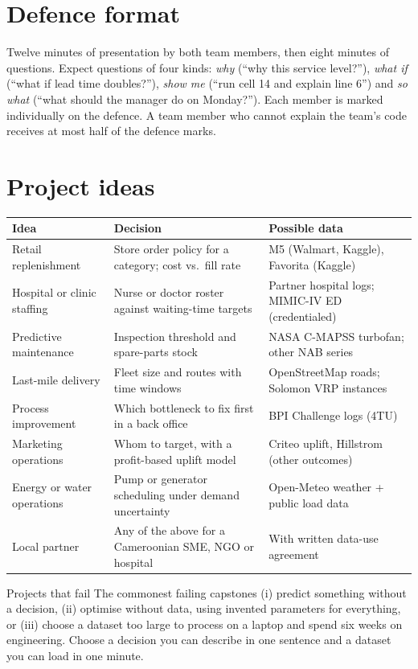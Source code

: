 \section*{Defence format}
Twelve minutes of presentation by both team members, then eight minutes of questions. Expect questions of four kinds:
\emph{why} (``why this service level?''), \emph{what if} (``what if lead time doubles?''), \emph{show me} (``run cell 14
and explain line 6'') and \emph{so what} (``what should the manager do on Monday?''). Each member is marked
individually on the defence. A team member who cannot explain the team's code receives at most half of the defence
marks.

\section*{Project ideas}
\begin{center}\small
\begin{tabularx}{\linewidth}{@{}L{4.2cm}Y L{3.4cm}@{}}
\toprule
\textbf{Idea} & \textbf{Decision} & \textbf{Possible data}\\\midrule
Retail replenishment & Store order policy for a category; cost vs.\ fill rate & M5 (Walmart, Kaggle), Favorita (Kaggle)\\
Hospital or clinic staffing & Nurse or doctor roster against waiting-time targets & Partner hospital logs; MIMIC-IV ED (credentialed)\\
Predictive maintenance & Inspection threshold and spare-parts stock & NASA C-MAPSS turbofan; other NAB series\\
Last-mile delivery & Fleet size and routes with time windows & OpenStreetMap roads; Solomon VRP instances\\
Process improvement & Which bottleneck to fix first in a back office & BPI Challenge logs (4TU)\\
Marketing operations & Whom to target, with a profit-based uplift model & Criteo uplift, Hillstrom (other outcomes)\\
Energy or water operations & Pump or generator scheduling under demand uncertainty & Open-Meteo weather + public load data\\
Local partner & Any of the above for a Cameroonian SME, NGO or hospital & With written data-use agreement\\\bottomrule
\end{tabularx}
\end{center}

\begin{pitfall}{Projects that fail}
The commonest failing capstones (i) predict something without a decision, (ii) optimise without data, using invented
parameters for everything, or (iii) choose a dataset too large to process on a laptop and spend six weeks on
engineering. Choose a decision you can describe in one sentence and a dataset you can load in one minute.
\end{pitfall}
